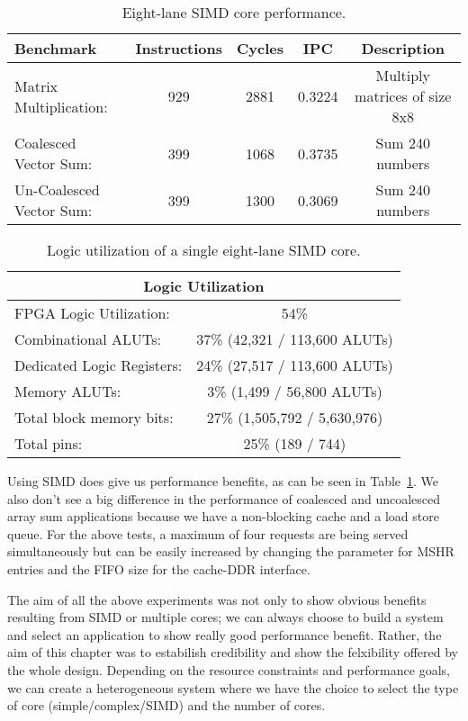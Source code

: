 \begin{table}[!htbp]
  \centering
  \caption{Eight-lane SIMD core performance.}
  \begin{tabular}{|l|c|c|c|c|}
    \hline
Benchmark		&Instructions 	&Cycles		&IPC		&Description\\
    \hline
Matrix Multiplication:	&929		&2881		&0.3224 	&Multiply matrices of size 8x8\\
Coalesced Vector Sum:	&399		&1068		&0.3735 	&Sum 240 numbers\\
Un-Coalesced Vector Sum:&399		&1300		&0.3069 	&Sum 240 numbers\\
    \hline
  \end{tabular}
  \label{table:perf3}
\end{table}

\begin{table}[!htbp]
  \centering
  \caption{Logic utilization of a single eight-lane SIMD core.}
  \begin{tabular}{|l|c|}
    \hline
    \multicolumn{2}{|c|}{Logic Utilization} \\
    \hline
FPGA Logic Utilization:		& 54\% 	\\
   Combinational ALUTs:		& 37\% 	(42,321 / 113,600 ALUTs)\\
   Dedicated Logic Registers:	& 24\% 	(27,517 / 113,600 ALUTs)\\
   Memory ALUTs:		& 3\% 	(1,499 / 56,800 ALUTs)\\
Total block memory bits:	& 27\%  (1,505,792 / 5,630,976)\\
Total pins:			& 25\% 	(189 / 744)\\
    \hline
  \end{tabular}
  \label{table:fpga_util3}
\end{table}

Using SIMD does give us performance benefits, as can be seen in  Table~\ref{table:perf3}. We also don't see a big difference in the performance of coalesced and uncoalesced array sum applications because we have a non-blocking cache and a load store queue. For the above tests, a maximum of four requests are being served simultaneously but can be easily increased by changing the parameter for MSHR entries and the FIFO size for the cache-DDR interface.

The aim of all the above experiments was not only to show obvious benefits resulting from SIMD or multiple cores; we can always choose to build a system and select an  application to show really good performance benefit. Rather, the aim of this chapter was to estabilish credibility and show the felxibility offered by the whole design. Depending on the resource constraints and performance goals, we can create a heterogeneous system where we have the choice to select the type of core (simple/complex/SIMD) and the number of cores.

